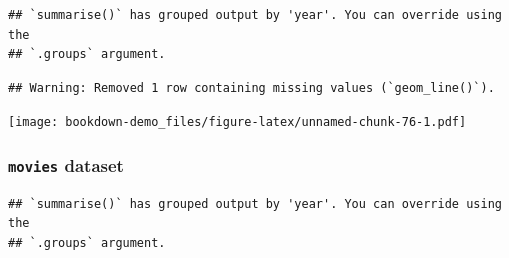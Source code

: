 \documentclass[
  b5paper]{book}
\newenvironment{Shaded}{\begin{snugshade}}{\end{snugshade}}
\newcommand{\AttributeTok}[1]{\textcolor[rgb]{0.13,0.29,0.53}{#1}}
\newcommand{\ConstantTok}[1]{\textcolor[rgb]{0.56,0.35,0.01}{#1}}
\newcommand{\DecValTok}[1]{\textcolor[rgb]{0.00,0.00,0.81}{#1}}
\newcommand{\FunctionTok}[1]{\textcolor[rgb]{0.13,0.29,0.53}{\textbf{#1}}}
\newcommand{\NormalTok}[1]{#1}
\newcommand{\OtherTok}[1]{\textcolor[rgb]{0.56,0.35,0.01}{#1}}
\newcommand{\SpecialCharTok}[1]{\textcolor[rgb]{0.81,0.36,0.00}{\textbf{#1}}}
\newcommand{\StringTok}[1]{\textcolor[rgb]{0.31,0.60,0.02}{#1}}
\begin{document}
\begin{verbatim}
## `summarise()` has grouped output by 'year'. You can override using the
## `.groups` argument.
\end{verbatim}

\begin{verbatim}
## Warning: Removed 1 row containing missing values (`geom_line()`).
\end{verbatim}

\texttt{[image: bookdown-demo\_files/figure-latex/unnamed-chunk-76-1.pdf]}

\hypertarget{movies-dataset-1}{%
\subsubsection*{\texorpdfstring{\texttt{movies} dataset}{movies dataset}}\label{movies-dataset-1}}

\begin{Shaded}
\end{Shaded}

\begin{verbatim}
## `summarise()` has grouped output by 'year'. You can override using the
## `.groups` argument.
\end{verbatim}
\end{document}
